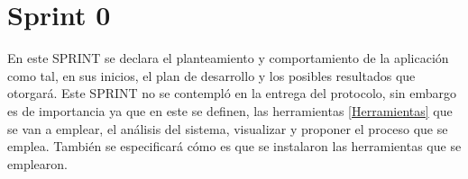 %	
%	
%	
%	
%	
%	

	\section{Sprint 0}
	\noindent En este SPRINT se declara el planteamiento y comportamiento de la aplicación como tal, en sus inicios, el plan de desarrollo y los posibles resultados que otorgará.
	Este SPRINT no se contempló en la entrega del protocolo, sin embargo es de importancia ya que en este se definen, las herramientas \ref{Herramientas} que se van a emplear, el análisis del sistema, visualizar y proponer el proceso que se emplea.
	También se especificará cómo es que se instalaron las herramientas que se emplearon.
	
